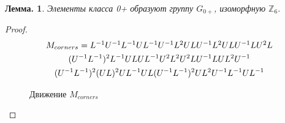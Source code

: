 \documentclass[utf8,russian]{beamer}
\newtheorem{ru_theo}{Лемма.}
\renewenvironment{theorem}{\begin{ru_theo}}{\end{ru_theo}}
\begin{document}
\begin{frame}
	\begin{theorem}
		Элементы класса 0+ образуют группу $G_{0+}$, изоморфную $\mathbb{Z}_6$.	
	\end{theorem}
	\begin{proof}
		\vspace*{-7mm}
		\begin{multline*}
		$$
		M_{corners}=L^{-1}U^{-1}L^{-1}UL^{-1}U^{-1}L^2ULU^{-1}L^2ULU^{-1}LU^2L \\
		(U^{-1}L^{-1})^2L^{-1}ULUL^{-1}U^2L^2U^2LU^{-1}LUL^2U^{-1} \\
		(U^{-1}L^{-1})^2(UL)^2UL^{-1}UL(U^{-1}L^{-1})^2UL^2U^{-1}L^{-1}UL^{-1}
		$$
		\end{multline*}
		\RubikCubeSolved
		\vspace*{-1cm}
		\begin{figure}[c]
		\caption{Движение $M_{corners}$}
		\end{figure}
		\vspace*{-7mm}
		\end{proof}
\end{frame}
\end{document}
